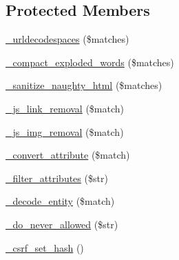 \subsection*{Protected Members}
\begin{DoxyCompactItemize}
\item 
\mbox{\hyperlink{class_c_i___security_aed66bb1c40ccc25c96326da7c0e2088a}{\+\_\+urldecodespaces}} (\$matches)
\item 
\mbox{\hyperlink{class_c_i___security_adfb0e251ae35ae40303a302d253c3ab2}{\+\_\+compact\+\_\+exploded\+\_\+words}} (\$matches)
\item 
\mbox{\hyperlink{class_c_i___security_af67689597607833df370031fb799c92b}{\+\_\+sanitize\+\_\+naughty\+\_\+html}} (\$matches)
\item 
\mbox{\hyperlink{class_c_i___security_a6b1744acaf85e05c65ab17242dea4f06}{\+\_\+js\+\_\+link\+\_\+removal}} (\$match)
\item 
\mbox{\hyperlink{class_c_i___security_a5c5e91dc8e3df0174e4e074dd375a8db}{\+\_\+js\+\_\+img\+\_\+removal}} (\$match)
\item 
\mbox{\hyperlink{class_c_i___security_ae16451bcdc769285c499cbf8068b3523}{\+\_\+convert\+\_\+attribute}} (\$match)
\item 
\mbox{\hyperlink{class_c_i___security_aa385a9c7527f5eece656b9cac73979d3}{\+\_\+filter\+\_\+attributes}} (\$str)
\item 
\mbox{\hyperlink{class_c_i___security_a5289832cb3ae9cee3c12e82ede958874}{\+\_\+decode\+\_\+entity}} (\$match)
\item 
\mbox{\hyperlink{class_c_i___security_a61217e43f888cdf8afb1fba16b5cd9f6}{\+\_\+do\+\_\+never\+\_\+allowed}} (\$str)
\item 
\mbox{\hyperlink{class_c_i___security_a7064dd5501c1dfab05ba6ac8838beb01}{\+\_\+csrf\+\_\+set\+\_\+hash}} ()
\end{DoxyCompactItemize}
